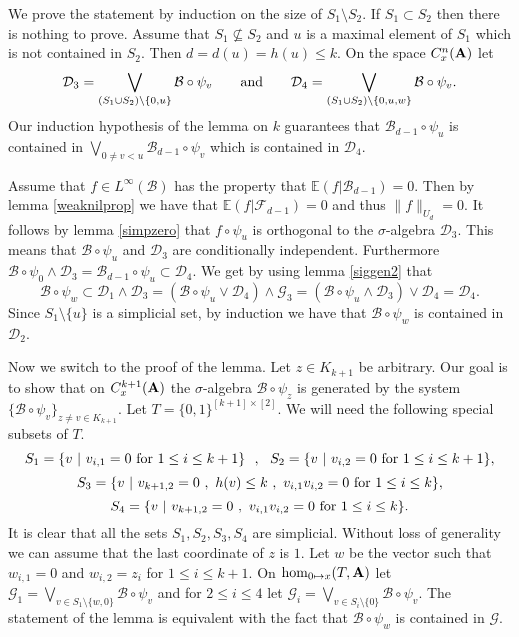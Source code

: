 \documentclass [11pt] {article}
\def\bA{{\bf A}}
\begin{document}
\medskip

We prove the statement by induction on the size of $S_1\setminus S_2$. If $S_1\subset S_2$ then there is nothing to prove. Assume that $S_1\nsubseteq S_2$ and $u$ is a maximal element of $S_1$ which is not contained in $S_2$. Then $d=d(u)=h(u)\leq k$.
On the space $C^n_x(\bA)$ let $$\mathcal{D}_3=\bigvee_ {(S_1\cup S_2)\setminus\{0,u\}}\mathcal{B}\circ\psi_v~~~~~~{\rm and}~~~~~~\mathcal{D}_4=\bigvee_ {(S_1\cup S_2)\setminus\{0,u,w\}}\mathcal{B}\circ\psi_v.$$
Our induction hypothesis of the lemma on $k$ guarantees that $\mathcal{B}_{d-1}\circ\psi_u$ is contained in $\bigvee_{0\neq v<u}\mathcal{B}_{d-1}\circ\psi_v$ which is contained in $\mathcal{D}_4$.

Assume that $f\in L^\infty(\mathcal{B})$ has the property that $\mathbb{E}(f|\mathcal{B}_{d-1})=0$. Then by lemma \ref{weaknilprop} we have that $\mathbb{E}(f|\mathcal{F}_{d-1})=0$ and thus $\|f\|_{U_d}=0$. It follows by lemma \ref{simpzero} that $f\circ\psi_u$ is orthogonal to the $\sigma$-algebra $\mathcal{D}_3$.
This means that $\mathcal{B}\circ\psi_u$ and $\mathcal{D}_3$ are conditionally independent. Furthermore $\mathcal{B}\circ\psi_0\wedge\mathcal{D}_3=\mathcal{B}_{d-1}\circ\psi_u\subset\mathcal{D}_4$.
We get by using lemma \ref{siggen2} that $$\mathcal{B}\circ\psi_w\subset\mathcal{D}_1\wedge\mathcal{D}_3=(\mathcal{B}\circ\psi_u\vee\mathcal{D}_4)\wedge\mathcal{G}_3=(\mathcal{B}\circ\psi_u \wedge\mathcal{D}_3)\vee\mathcal{D}_4=\mathcal{D}_4.$$ 
Since $S_1\setminus\{u\}$ is a simplicial set, by induction we have that $\mathcal{B}\circ\psi_w$ is contained in $\mathcal{D}_2$.

\bigskip

Now we switch to the proof of the lemma. Let $z\in K_{k+1}$ be arbitrary. Our goal is to show that on $C^{k+1}_x(\bA)$ the $\sigma$-algebra $\mathcal{B}\circ\psi_z$ is generated by the system $\{\mathcal{B}\circ\psi_v\}_{z\neq v\in K_{k+1}}$. Let $T=\{0,1\}^{[k+1]\times[2]}$. 
We will need the following special subsets of $T$. 
$$S_1=\{v~|~v_{i,1}=0~{\rm for}~1\leq i\leq k+1\} ~~,~~S_2=\{v~|~v_{i,2}=0~{\rm for}~1\leq i\leq k+1\},$$
$$S_3=\{v~|~v_{k+1,2}=0~,~h(v)\leq k~,~v_{i,1}v_{i,2}=0~{\rm for}~1\leq i\leq k\},$$
$$S_4=\{v~|~v_{k+1,2}=0~,~v_{i,1}v_{i,2}=0~{\rm for}~1\leq i\leq k\}.$$
It is clear that all the sets $S_1,S_2,S_3,S_4$ are simplicial. 
Without loss of generality we can assume that the last coordinate of $z$ is $1$.
Let $w$ be the vector such that $w_{i,1}=0$ and $w_{i,2}=z_i$ for $1\leq i\leq k+1$.
On $\hom_{0\mapsto x}(T,\bA)$ let $\mathcal{G}_1=\bigvee_{v\in S_1\setminus\{w,0\}}\mathcal{B}\circ\psi_v$ and for $2\leq i\leq 4$ let
$\mathcal{G}_i=\bigvee_{v\in S_i\setminus\{0\}}\mathcal{B}\circ\psi_v$.
The statement of the lemma is equivalent with the fact that $\mathcal{B}\circ\psi_w$ is contained in $\mathcal{G}$. 
\end{document}
